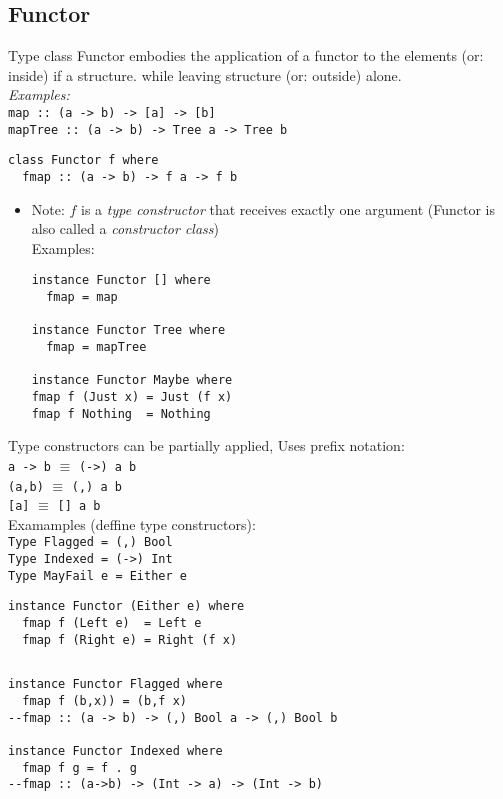\documentclass{article}
\newcommand{\Haskell}[1]{\texttt{#1}}
\begin{document}
\subsection{Functor}
Type class Functor embodies the application of a functor to the elements (or: inside) if a structure. while leaving structure (or: outside) alone.\\
\emph{Examples:}\\
\Haskell{map :: (a -> b) -> [a] -> [b]}\\
\Haskell{mapTree :: (a -> b) -> Tree a -> Tree b}
\begin{verbatim}
class Functor f where
  fmap :: (a -> b) -> f a -> f b
\end{verbatim}
\begin{itemize}
\item Note: $f$ is a \emph{type constructor} that receives exactly one argument (Functor is also called a \emph{constructor class})\\
Examples:\\
\begin{verbatim}
instance Functor [] where
  fmap = map

instance Functor Tree where
  fmap = mapTree

instance Functor Maybe where
fmap f (Just x) = Just (f x)
fmap f Nothing  = Nothing
\end{verbatim}
\end{itemize}
Type constructors can be partially applied, Uses prefix notation:\\
\Haskell{a -> b} $\equiv$ \Haskell{(->) a b}\\
\Haskell{(a,b)}  $\equiv$ \Haskell{(,) a b}\\
\Haskell{[a]}  $\equiv$ \Haskell{[] a b}\\
Examamples (deffine type constructors):\\
\Haskell{Type Flagged   = (,) Bool}\\
\Haskell{Type Indexed   = (->) Int}\\
\Haskell{Type MayFail e = Either e}
\begin{verbatim}
instance Functor (Either e) where
  fmap f (Left e)  = Left e 
  fmap f (Right e) = Right (f x)
\end{verbatim}
\inputminted[]{Haskell}{round.hs}
\begin{verbatim}
instance Functor Flagged where
  fmap f (b,x)) = (b,f x)
--fmap :: (a -> b) -> (,) Bool a -> (,) Bool b

instance Functor Indexed where
  fmap f g = f . g
--fmap :: (a->b) -> (Int -> a) -> (Int -> b)
\end{verbatim}
\end{document}
